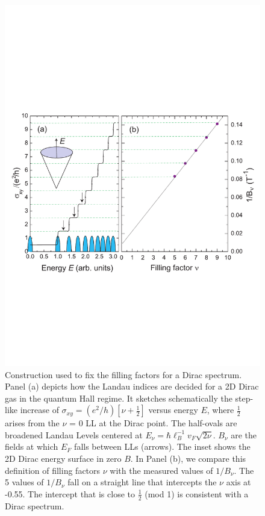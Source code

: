 \begin{figure}[!htbp]
  \begin{center}            
\includegraphics[width=0.9\linewidth]{ch-bts/figures/FigDiracIndex2.pdf} 
\caption{\label{figindex} 
Construction used to fix the filling factors for a Dirac spectrum.  Panel (a) depicts how the Landau indices are decided for a 2D Dirac gas in the quantum Hall regime. It sketches
schematically the step-like increase of $\sigma_{xy} = (e^2/h)[\nu+\frac12]$ versus energy $E$,
where $\frac12$ arises from the $\nu$ = 0 LL at the Dirac point.
The half-ovals are broadened Landau Levels centered at $E_{\nu}=\hbar\ell_B^{-1} v_F\sqrt{2\nu}$.
$B_{\nu}$ are the fields at which $E_F$ falls between LLs (arrows).  The inset
shows the 2D Dirac energy surface in zero $B$.  In Panel (b), we compare this definition of filling factors $\nu$ with
the measured values of $1/B_{\nu}$.
The 5 values of $1/B_{\nu}$ fall on a straight line 
that intercepts the $\nu$ axis at -0.55. The intercept that is close to $\frac{1}{2}$ (mod 1) is consistent with a Dirac spectrum.  
} 
  \end{center}
\end{figure}

